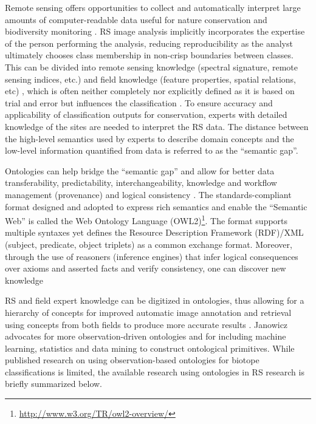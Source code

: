 \documentclass[authoryear, review,12pt,number]{elsarticle}
\begin{document}
Remote sensing offers opportunities to collect and automatically interpret large
amounts of computer-readable data useful for nature conservation and
biodiversity monitoring \citep{Corbane2015, VandenBorre2011, Mayer2011}. RS
image analysis implicitly incorporates the expertise of the person performing
the analysis, reducing reproducibility as the analyst ultimately chooses class
membership in non-crisp boundaries between classes. This can be divided into
remote sensing knowledge (spectral signature, remote sensing indices, etc.) and
field knowledge (feature properties, spatial relations, etc)
\citep{Andres2013a}, which is often neither completely nor explicitly defined as
it is based on trial and error but influences the classification
\citep{Arvor2013}. To ensure accuracy and applicability of classification
outputs for conservation, experts with detailed knowledge of the sites are
needed to interpret the RS data. The distance between the high-level semantics
used by experts to describe domain concepts and the low-level information
quantified from data is referred to as the ``semantic gap''.

Ontologies can help bridge the ``semantic gap'' and allow for better data
transferability, predictability, interchangeability, knowledge and workflow
management (provenance) and logical consistency \citep{Janowicz2012}.  The
standards-compliant format designed and adopted to express rich semantics and
enable the ``Semantic Web'' is called the Web Ontology Language
(OWL2)\footnote{\url{http://www.w3.org/TR/owl2-overview/}}. The format supports
multiple syntaxes yet defines the Resource Description Framework (RDF)/XML
(subject, predicate, object triplets) as a common exchange format.  Moreover,
through the use of reasoners (inference engines) that infer logical consequences
over axioms and asserted facts and verify consistency, one can discover new
knowledge \citep{Arvor2013, Andres2013a}

RS and field expert knowledge can be digitized in ontologies, thus allowing for
a hierarchy of concepts for improved automatic image annotation and retrieval
using concepts from both fields to produce more accurate results
\citep{Srikanth_2005}. Janowicz \cite{Janowicz2012} advocates for more
observation-driven ontologies and for including machine learning, statistics and
data mining to construct ontological primitives. While published research on
using observation-based ontologies for biotope classifications is limited, the
available research using ontologies in RS research is briefly summarized below.
\end{document}

